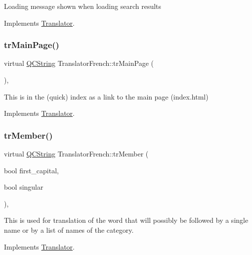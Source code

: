 Loading message shown when loading search results 

Implements \mbox{\hyperlink{class_translator}{Translator}}.

\mbox{\label{class_translator_french_a7ccc29d58d59d83564e8479ae4fbd567}} 
\subsubsection{\texorpdfstring{trMainPage()}{trMainPage()}}
{\footnotesize\ttfamily virtual \mbox{\hyperlink{class_q_c_string}{Q\+C\+String}} Translator\+French\+::tr\+Main\+Page (\begin{DoxyParamCaption}{ }\end{DoxyParamCaption})\hspace{0.3cm}{\ttfamily [inline]}, {\ttfamily [virtual]}}

This is in the (quick) index as a link to the main page (index.\+html) 

Implements \mbox{\hyperlink{class_translator}{Translator}}.

\mbox{\label{class_translator_french_a07e9427baaa886ce5ac81c43cb7a515b}} 
\subsubsection{\texorpdfstring{trMember()}{trMember()}}
{\footnotesize\ttfamily virtual \mbox{\hyperlink{class_q_c_string}{Q\+C\+String}} Translator\+French\+::tr\+Member (\begin{DoxyParamCaption}\item[{bool}]{first\+\_\+capital,  }\item[{bool}]{singular }\end{DoxyParamCaption})\hspace{0.3cm}{\ttfamily [inline]}, {\ttfamily [virtual]}}

This is used for translation of the word that will possibly be followed by a single name or by a list of names of the category. 

Implements \mbox{\hyperlink{class_translator}{Translator}}.

\mbox{\label{class_translator_french_ae691302ea6f0d8a750d21db5e83b8293}} 
